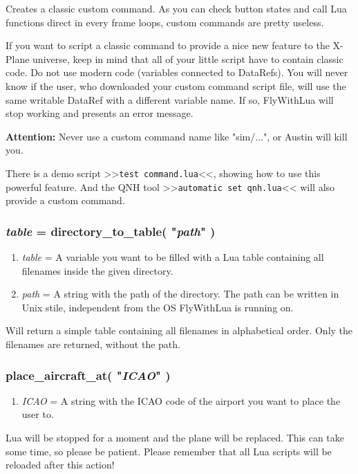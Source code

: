 \documentclass[11pt,parskip=half,a4paper]{scrartcl}
\begin{document}
Creates a classic custom command. As you can check button states and call Lua functions direct in every frame loops, custom commands are pretty useless.

If you want to script a classic command to provide a nice new feature to the X-Plane universe, keep in mind that all of your little script have to contain classic code. Do not use modern code (variables connected to DataRefs). You will never know if the user, who downloaded your custom command script file, will use the same writable DataRef with a different variable name. If so, FlyWithLua will stop working and presents an error message.

\textbf{Attention:} Never use a custom command name like "sim/...", or Austin will kill you.

There is a demo script >>\verb|test command.lua|<<, showing how to use this powerful feature. And the QNH tool >>\verb|automatic set qnh.lua|<< will also provide a custom command. 

\subsubsection{\emph{table} = directory\_to\_table( "\emph{path}" )}

\begin{enumerate}
	\item \emph{table} = A variable you want to be filled with a Lua table containing all filenames inside the given directory.
	\item \emph{path} = A string with the path of the directory. The path can be written in Unix stile, independent from the OS FlyWithLua is running on.
\end{enumerate}

Will return a simple table containing all filenames in alphabetical order. Only the filenames are returned, without the path.

\subsubsection{place\_aircraft\_at( "\emph{ICAO}" )}

\begin{enumerate}
	\item \emph{ICAO} = A string with the ICAO code of the airport you want to place the user to.
\end{enumerate}

Lua will be stopped for a moment and the plane will be replaced. This can take some time, so please be patient. Please remember that all Lua scripts will be reloaded after this action!
\end{document}
